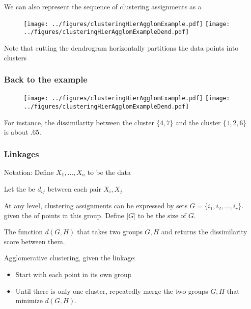 \documentclass{beamer}
\begin{document}
\begin{frame}
We can also represent the sequence of clustering assignments as a 
\begin{figure}[h!]
  \centering
  \texttt{[image: ../figures/clusteringHierAgglomExample.pdf]}
  \texttt{[image: ../figures/clusteringHierAgglomExampleDend.pdf]}  
\end{figure}
Note that cutting the dendrogram horizontally partitions the data points into clusters
\end{frame}



\begin{frame}
\frametitle{Back to the example}
\begin{figure}[h!]
  \centering
  \texttt{[image: ../figures/clusteringHierAgglomExample.pdf]}
  \texttt{[image: ../figures/clusteringHierAgglomExampleDend.pdf]}  
\end{figure}
For instance, the dissimilarity between the cluster $\{4,7\}$ and the cluster $\{1,2,6\}$ is about .65.
\end{frame}

\begin{frame}
\frametitle{Linkages}
Notation: Define $X_1,\ldots, X_n$ to be the data

\vsp
Let the  be $d_{ij}$ between each pair $X_i, X_j$

\vsp
At any level, clustering assignments can be expressed by sets $G = \{ i_1, i_2, \ldots, i_r\}$. given the 
of points in this group.  Define $|G|$ to be the size of $G$.  

\vsp
{}  The function $d(G,H)$ that takes two groups $G,H$ and returns the dissimilarity score between them.

\vsp 
Agglomerative clustering, given the linkage:
\begin{itemize}
\item Start with each point in its own group
\item Until there is only one cluster, repeatedly merge the two groups $G,H$ that minimize $d(G,H)$.
\end{itemize}
\end{frame}
\end{document}
